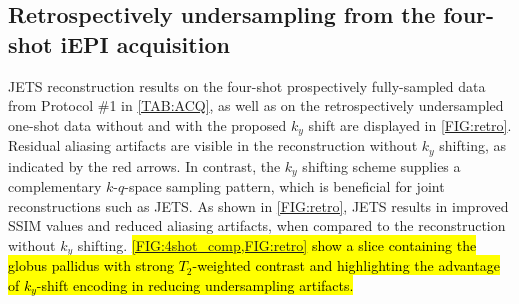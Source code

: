 \documentclass[preprint,12pt,authoryear,review]{elsarticle}
\begin{document}
    \subsection{Retrospectively undersampling from the four-shot iEPI acquisition}

    JETS reconstruction results on
    the four-shot prospectively fully-sampled data
    from Protocol \#1 in \cref{TAB:ACQ},
    as well as on the retrospectively undersampled one-shot data
    without and with the proposed $k_y$ shift
    are displayed in \cref{FIG:retro}.
    Residual aliasing artifacts are visible in the reconstruction
    without $k_y$ shifting, as indicated by the red arrows.
    In contrast, the $k_y$ shifting scheme supplies a complementary
    $k$-$q$-space sampling pattern,
    which is beneficial for joint reconstructions such as JETS.
    As shown in \cref{FIG:retro}, JETS results in
    improved SSIM values and reduced aliasing artifacts,
    when compared to the reconstruction without $k_y$ shifting.
    \hl{\mbox{\cref{FIG:4shot_comp,FIG:retro}} show a slice
    containing the globus pallidus with strong $T_2$-weighted contrast and
    highlighting the advantage of $k_y$-shift encoding
    in reducing undersampling artifacts.}
\end{document}
